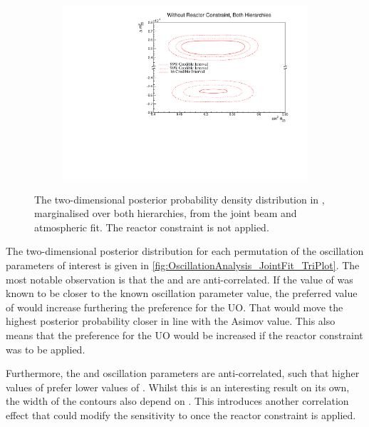 \begin{figure}[h]
  \begin{subfigure}[t]{0.95\textwidth}
    \includegraphics[width=\textwidth, trim={0mm 0mm 0mm 0mm}, clip,page=1]{Figures/OA/JointFit/Contours_2D_th23_dm32_BH_0_woRC_UnSmeared_CredibleInterval.pdf}
  \end{subfigure}
  \caption{The two-dimensional posterior probability density distribution in , marginalised over both hierarchies, from the joint beam and atmospheric fit. The reactor constraint is not applied.}
  \label{fig:OscillationAnalysis_JointFit_DM32TH23}
\end{figure}


The two-dimensional posterior distribution for each permutation of the oscillation parameters of interest is given in \autoref{fig:OscillationAnalysis_JointFit_TriPlot}. The most notable observation is that the  and  are anti-correlated. If the value of  was known to be closer to the known oscillation parameter value, the preferred value of  would increase furthering the preference for the UO. That would move the highest posterior probability closer in line with the Asimov value. This also means that the preference for the UO would be increased if the reactor constraint was to be applied.

Furthermore, the  and  oscillation parameters are anti-correlated, such that higher values of  prefer lower values of . Whilst this is an interesting result on its own, the width of the  contours also depend on . This introduces another correlation effect that could modify the sensitivity to  once the reactor constraint is applied.

